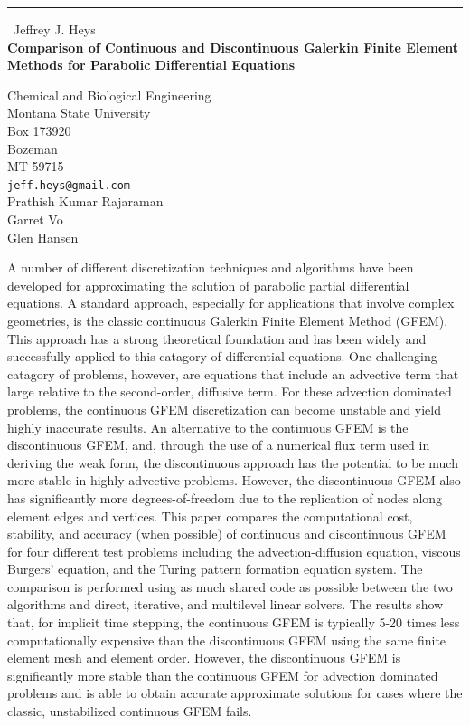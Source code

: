 \documentclass{report}
\begin{document}
\begin{center}
\rule{6in}{1pt} \
{\large Jeffrey J. Heys \\
{\bf Comparison of Continuous and Discontinuous Galerkin Finite Element Methods for Parabolic Differential Equations}}

Chemical and Biological Engineering \\ Montana State University \\ Box 173920 \\ Bozeman \\ MT 59715
\\
{\tt jeff.heys@gmail.com}\\
Prathish Kumar Rajaraman\\
Garret Vo\\
Glen Hansen\end{center}

A number of different discretization techniques and algorithms have been
developed for approximating the solution of parabolic partial
differential equations. A standard approach, especially for applications
that involve complex geometries, is the classic continuous Galerkin
Finite Element Method (GFEM). This approach has a strong theoretical
foundation and has been widely and successfully applied to this catagory
of differential equations. One challenging catagory of problems, however,
are equations that include an advective term that large relative to the
second-order, diffusive term. For these advection dominated problems, the
continuous GFEM discretization can become unstable and yield highly
inaccurate results. An alternative to the continuous GFEM is the
discontinuous GFEM, and, through the use of a numerical flux term used in
deriving the weak form, the discontinuous approach has the potential to
be much more stable in highly advective problems. However, the
discontinuous GFEM also has significantly more degrees-of-freedom due to
the replication of nodes along element edges and vertices. This paper
compares the computational cost, stability, and accuracy (when possible)
of continuous and discontinuous GFEM for four different test problems
including the advection-diffusion equation, viscous Burgers' equation,
and the Turing pattern formation equation system. The comparison is
performed using as much shared code as possible between the two
algorithms and direct, iterative, and multilevel linear solvers. The
results show that, for implicit time stepping, the continuous GFEM is
typically 5-20 times less computationally expensive than the
discontinuous GFEM using the same finite element mesh and element order.
However, the discontinuous GFEM is significantly more stable than the
continuous GFEM for advection dominated problems and is able to obtain
accurate approximate solutions for cases where the classic, unstabilized
continuous GFEM fails.
\end{document}
